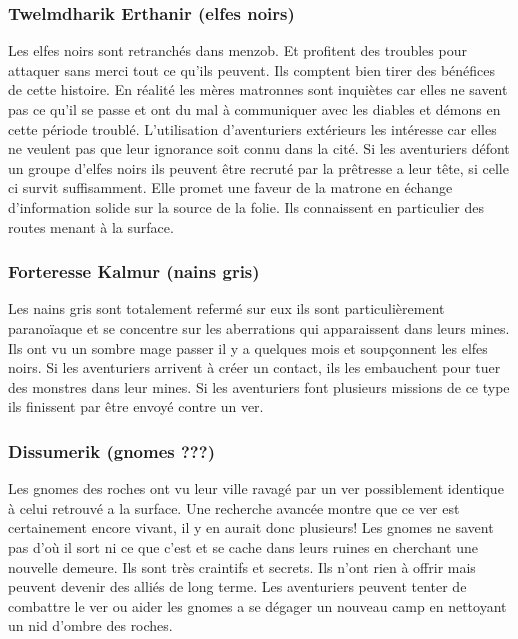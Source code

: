 \subsubsection*{Twelmdharik Erthanir (elfes noirs)}

Les elfes noirs sont retranchés dans menzob. Et profitent des troubles pour attaquer 
sans merci tout ce qu'ils peuvent. Ils comptent bien tirer des bénéfices de cette 
histoire. En réalité les mères matronnes sont inquiètes car elles ne savent pas ce 
qu'il se passe et ont du mal à communiquer avec les diables et démons en cette période 
troublé. L'utilisation d'aventuriers extérieurs les intéresse car elles ne veulent 
pas que leur ignorance soit connu dans la cité. Si les aventuriers défont un groupe 
d'elfes noirs ils peuvent être recruté par la prêtresse a leur tête, si celle ci 
survit suffisamment. Elle promet une faveur de la matrone en échange d'information 
solide sur la source de la folie. Ils connaissent en particulier des routes menant 
à la surface. 

\subsubsection*{Forteresse Kalmur (nains gris)}

Les nains gris sont totalement refermé sur eux ils sont particulièrement paranoïaque 
et se concentre sur les aberrations qui apparaissent dans leurs mines. Ils ont vu un 
sombre mage passer il y a quelques mois et soupçonnent les elfes noirs. Si les 
aventuriers arrivent à créer un contact, ils les embauchent pour tuer des monstres 
dans leur mines. Si les aventuriers font plusieurs missions de ce type ils finissent 
par être envoyé contre un ver.

\subsubsection*{Dissumerik (gnomes ???)}

Les gnomes des roches ont vu leur ville ravagé par un ver possiblement identique à 
celui retrouvé a la surface. Une recherche avancée montre que ce ver est certainement 
encore vivant, il y en aurait donc plusieurs! Les gnomes ne savent pas d'où il sort 
ni ce que c'est et se cache dans leurs ruines en cherchant une nouvelle demeure. Ils 
sont très craintifs et secrets. Ils n'ont rien à offrir mais peuvent devenir des 
alliés de long terme. Les aventuriers peuvent tenter de combattre le ver ou aider 
les gnomes a se dégager un nouveau camp en nettoyant un nid d'ombre des roches.

